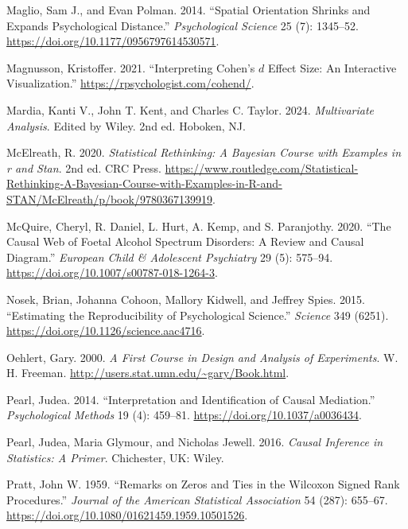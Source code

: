 \documentclass[
  11pt,
  letterpaper,
]{scrbook}
\newlength{\cslhangindent}
\newenvironment{CSLReferences}[2] %
 {\begin{list}{}{%
  \setlength{\itemindent}{0pt}
  \setlength{\leftmargin}{0pt}
  \setlength{\parsep}{0pt}
  \ifodd #1
   \setlength{\leftmargin}{\cslhangindent}
   \setlength{\itemindent}{-1\cslhangindent}
  \fi
  \setlength{\itemsep}{#2\baselineskip}}}
 {\end{list}}
\theoremstyle{definition}
\theoremstyle{definition}
\theoremstyle{remark}
\begin{document}
\begin{CSLReferences}{1}{0}
Maglio, Sam J., and Evan Polman. 2014. {``Spatial Orientation Shrinks
and Expands Psychological Distance.''} \emph{Psychological Science} 25
(7): 1345--52. \url{https://doi.org/10.1177/0956797614530571}.

Magnusson, Kristoffer. 2021. {``Interpreting {C}ohen's \(d\) Effect
Size: An Interactive Visualization.''}
\url{https://rpsychologist.com/cohend/}.

Mardia, Kanti V., John T. Kent, and Charles C. Taylor. 2024.
\emph{Multivariate Analysis}. Edited by Wiley. 2nd ed. Hoboken, NJ.

McElreath, R. 2020. \emph{Statistical Rethinking: A Bayesian Course with
Examples in r and Stan}. 2nd ed. CRC Press.
\url{https://www.routledge.com/Statistical-Rethinking-A-Bayesian-Course-with-Examples-in-R-and-STAN/McElreath/p/book/9780367139919}.

McQuire, Cheryl, R. Daniel, L. Hurt, A. Kemp, and S. Paranjothy. 2020.
{``The Causal Web of Foetal Alcohol Spectrum Disorders: A Review and
Causal Diagram.''} \emph{European Child {\&} Adolescent Psychiatry} 29
(5): 575--94. \url{https://doi.org/10.1007/s00787-018-1264-3}.

Nosek, Brian, Johanna Cohoon, Mallory Kidwell, and Jeffrey Spies. 2015.
{``Estimating the Reproducibility of Psychological Science.''}
\emph{Science} 349 (6251).
\url{https://doi.org/10.1126/science.aac4716}.

Oehlert, Gary. 2000. \emph{A First Course in Design and Analysis of
Experiments}. W. H. Freeman.
\url{http://users.stat.umn.edu/~gary/Book.html}.

Pearl, Judea. 2014. {``Interpretation and Identification of Causal
Mediation.''} \emph{Psychological Methods} 19 (4): 459--81.
\url{https://doi.org/10.1037/a0036434}.

Pearl, Judea, Maria Glymour, and Nicholas Jewell. 2016. \emph{Causal
Inference in Statistics: A Primer}. Chichester, UK: Wiley.

Pratt, John W. 1959. {``Remarks on Zeros and Ties in the {W}ilcoxon
Signed Rank Procedures.''} \emph{Journal of the American Statistical
Association} 54 (287): 655--67.
\url{https://doi.org/10.1080/01621459.1959.10501526}.


\end{CSLReferences}
\end{document}
